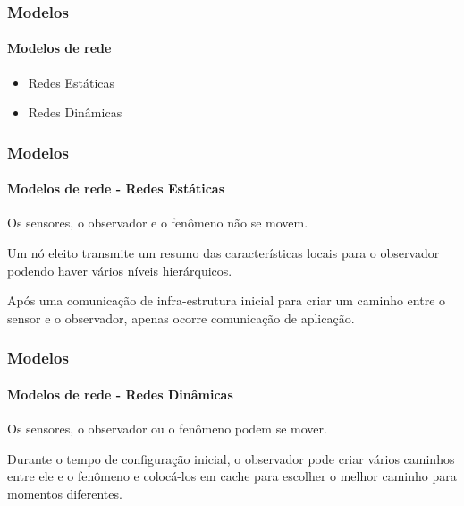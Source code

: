\documentclass[notes]{beamer}
\begin{document}
\begin{frame}
\label{slide_58}
\frametitle{Modelos}
\framesubtitle{Modelos de rede}

\begin{block}

\begin{itemize}

\item Redes Estáticas \pause
\item Redes Dinâmicas

\end{itemize}

\end{block}

\end{frame}

\begin{frame}
\label{slide_59}
\frametitle{Modelos}
\framesubtitle{Modelos de rede - Redes Estáticas}

\begin{block}

Os sensores, o observador e o fenômeno não se movem.

\end{block} \pause

\begin{block}

Um nó eleito transmite um resumo das características locais para o observador podendo haver vários níveis hierárquicos. 

\end{block} \pause

\begin{block}

Após uma comunicação de infra-estrutura inicial para criar um caminho entre o sensor e o observador, apenas ocorre comunicação de aplicação. 

\end{block}

\end{frame}

\begin{frame}
\label{slide_60}
\frametitle{Modelos}
\framesubtitle{Modelos de rede - Redes Dinâmicas}

\begin{block}

Os sensores, o observador ou o fenômeno podem se mover.

\end{block} \pause

\begin{block}

Durante o tempo de configuração inicial, o observador pode criar vários caminhos entre ele e o fenômeno e colocá-los em cache para escolher o melhor caminho para momentos diferentes.  

\end{block}

\end{frame}
\end{document}
